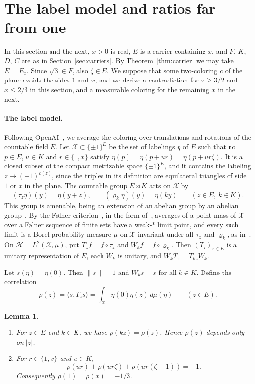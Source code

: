 \documentclass[10pt]{article}
\newtheorem{lem}[thm]{Lemma}
\theoremstyle{remark}
\newcommand{\calH}{\mathcal H}
\begin{document}
\section{The label model and ratios far from one}\label{sec:label}

In this section and the next, $x>0$ is real, $E$ is a carrier containing $x$, and $F$, $K$, $D$, $C$ are as in Section~\ref{sec:carriers}. By Theorem~\ref{thm:carrier} we may take $E=E_x$. Since $\sqrt3\in F$, also $\zeta\in E$. We suppose that some two-coloring $c$ of the plane avoids the sides $1$ and $x$, and we derive a contradiction for $x\ge3/2$ and $x\le2/3$ in this section, and a measurable coloring for the remaining $x$ in the next.

\paragraph{The label model.} Following OpenAI~\cite[Proposition~4.2]{OAI}, we average the coloring over translations and rotations of the countable field $E$. Let $\mathcal X\subset\{\pm1\}^E$ be the set of labelings $\eta$ of $E$ such that no $p\in E$, $u\in K$ and $r\in\{1,x\}$ satisfy $\eta(p)=\eta(p+ur)=\eta(p+ur\zeta)$. It is a closed subset of the compact metrizable space $\{\pm1\}^E$, and it contains the labeling $z\mapsto(-1)^{c(z)}$, since the triples in its definition are equilateral triangles of side $1$ or $x$ in the plane. The countable group $E\rtimes K$ acts on $\mathcal X$ by
\[
 (\tau_z\eta)(y)=\eta(y+z),\qquad(\varrho_k\eta)(y)=\eta(ky)\qquad(z\in E,\ k\in K).
\]
This group is amenable, being an extension of an abelian group by an abelian group~\cite[Theorem~G.2.1 and Proposition~G.2.2(ii)]{BHV}. By the F\o lner criterion~\cite{Folner}, in the form of~\cite[Theorem~G.5.1]{BHV}, averages of a point mass of $\mathcal X$ over a F\o lner sequence of finite sets have a weak-$*$ limit point, and every such limit is a Borel probability measure $\mu$ on $\mathcal X$ invariant under all $\tau_z$ and $\varrho_k$, as in~\cite[Proposition~4.2]{OAI}. On $\calH=L^2(\mathcal X,\mu)$, put $T_zf=f\circ\tau_z$ and $W_kf=f\circ\varrho_k$. Then $(T_z)_{z\in E}$ is a unitary representation of $E$, each $W_k$ is unitary, and $W_kT_z=T_{kz}W_k$.

Let $s(\eta)=\eta(0)$. Then $\|s\|=1$ and $W_ks=s$ for all $k\in K$. Define the correlation
\[
 \rho(z)=\langle s,T_zs\rangle=\int_{\mathcal X}\eta(0)\eta(z)\,d\mu(\eta)\qquad(z\in E).
\]

\begin{lem}\label{lem:correlation}
\begin{enumerate}
\item[(a)] For $z\in E$ and $k\in K$, we have $\rho(kz)=\rho(z)$. Hence $\rho(z)$ depends only on $|z|$.
\item[(b)] For $r\in\{1,x\}$ and $u\in K$,
\[
 \rho(ur)+\rho(ur\zeta)+\rho(ur(\zeta-1))=-1.
\]
Consequently $\rho(1)=\rho(x)=-1/3$.
\end{enumerate}
\end{lem}
\end{document}
